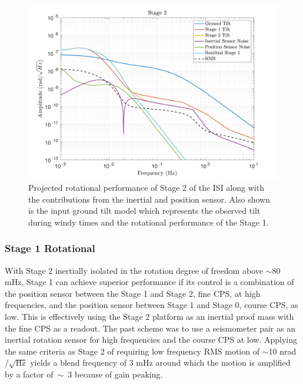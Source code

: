\documentclass [12pt, proquest]{uwthesis}[2019]
\begin{document}
\begin{figure}[!h]
\begin{center}
\includegraphics[width=\textwidth]{cBRS_Model_ST2RX.pdf}
\caption[Projected rotational performance of Stage 2 of the ISI]{Projected rotational performance of Stage 2 of the ISI along with the contributions from the inertial and position sensor. Also shown is the input ground tilt model which represents the observed tilt during windy times and the rotational performance of the Stage 1.}
\label{cBRS2R}
\end{center}
\end{figure}

\subsubsection{Stage 1 Rotational}

With Stage 2 inertially isolated in the rotation degree of freedom above $\sim$80 mHz, Stage 1 can achieve superior performance if its control is a combination of the position sensor between the Stage 1 and Stage 2, fine CPS, at high frequencies, and the position sensor between Stage 1 and Stage 0, course CPS, as low. This is effectively using the Stage 2 platform as an inertial proof mass with the fine CPS as a readout. The past scheme was to use a seismometer pair as an inertial rotation sensor for high frequencies and the course CPS at low. Applying the same criteria as Stage 2 of requiring low frequency RMS motion of $\sim$10 nrad$/\sqrt{\text{Hz}}$ yields a blend frequency of 3 mHz around which the motion is amplified by a factor of~$\sim$~3 because of gain peaking. 
\end{document}
